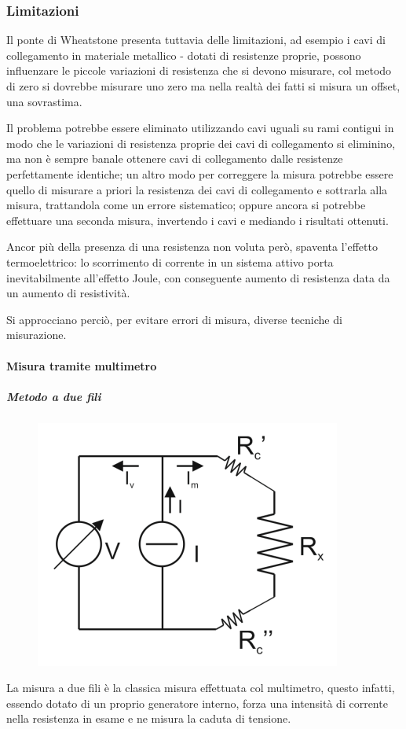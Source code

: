 \documentclass[a4paper, 15pt]{article}
\begin{document}
\subsubsection{Limitazioni}	
\begin{adjustwidth}{2in}{}
		Il ponte di Wheatstone presenta tuttavia delle limitazioni, ad esempio i cavi di collegamento in materiale metallico - dotati di resistenze proprie, possono influenzare  le piccole variazioni di resistenza che si devono misurare, col metodo di zero si dovrebbe misurare uno zero ma nella realtà dei fatti si misura un offset, una sovrastima. 
		
		Il problema potrebbe essere eliminato utilizzando cavi uguali su rami contigui in modo  che le variazioni di resistenza proprie dei cavi di collegamento si eliminino, ma non è sempre banale ottenere cavi di collegamento dalle resistenze perfettamente identiche; un altro modo per correggere la misura potrebbe essere quello di misurare a priori la resistenza dei cavi di collegamento e sottrarla alla misura, trattandola come un errore sistematico; oppure ancora si potrebbe effettuare una seconda misura,  invertendo i cavi e mediando i risultati ottenuti. \newline 
		
		Ancor più della presenza di una resistenza non voluta però, spaventa l'effetto termoelettrico: lo scorrimento di corrente in un sistema attivo porta inevitabilmente all'effetto Joule, con conseguente aumento di resistenza data da un aumento di resistività. 
		
		Si approcciano perciò, per evitare errori di misura, diverse tecniche di misurazione. 
\newpage 		
\paragraph{Misura tramite multimetro}
\subparagraph{Metodo a due fili} \mbox{} 
		\begin{figure}[H]
			\centering
			\includegraphics[width=0.3\linewidth]{fig/screenshot020}
			\label{fig:screenshot020}
		\end{figure}
		La misura a due fili è la classica misura effettuata col multimetro, questo infatti, essendo dotato di un proprio generatore interno, forza una intensità di corrente nella resistenza in esame e ne misura la caduta di tensione.
		

\end{adjustwidth}
\end{document}
